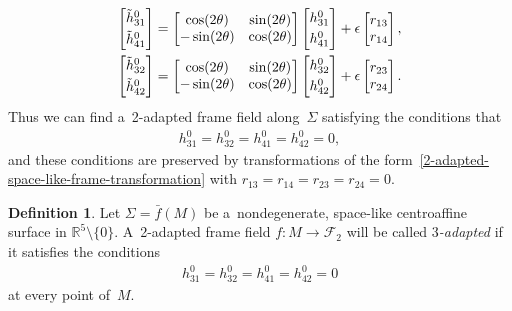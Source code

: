 \documentclass[pdftex]{sigma}
\numberwithin{equation}{section}
\theoremstyle{definition}
\newtheorem{dfn}[teo]{Definition}
\begin{document}
\begin{gather*}
\begin{bmatrix}
\tilde{h}^0_{31}
\vspace{1mm}\\
\tilde{h}^0_{41}
\end{bmatrix}
=
\begin{bmatrix}
\cos(2\theta) & \sin(2\theta)
\\
-\sin(2\theta) & \cos(2\theta)
\end{bmatrix}
\begin{bmatrix}
h^0_{31}
\vspace{1mm}\\
h^0_{41}
\end{bmatrix}
+ \epsilon
\begin{bmatrix}
r_{13}
\\
r_{14}
\end{bmatrix},
\\
\begin{bmatrix}
\tilde{h}^0_{32}
\vspace{1mm}\\
\tilde{h}^0_{42}
\end{bmatrix}
=
\begin{bmatrix}
\cos(2\theta) & \sin(2\theta)
\\
-\sin(2\theta) & \cos(2\theta)
\end{bmatrix}
\begin{bmatrix}
h^0_{32}
\vspace{1mm}\\
h^0_{42}
\end{bmatrix}
+ \epsilon
\begin{bmatrix}
r_{23}
\\
r_{24}
\end{bmatrix}.
\end{gather*}
Thus we can f\/ind a~2-adapted frame f\/ield along~$\Sigma$ satisfying the conditions that
\begin{gather*}
h^0_{31} = h^0_{32} = h^0_{41} = h^0_{42} = 0,
\end{gather*}
and these conditions are preserved by transformations of the form~\eqref{2-adapted-space-like-frame-transformation} with
$r_{13} = r_{14} = r_{23} = r_{24} = 0$.

\begin{dfn}
Let $\Sigma = \bar{f}(M)$ be a~nondegenerate, space-like centroaf\/f\/ine surface in $\mathbb{R}^5 \setminus \{0\}$.
A~2-adapted frame f\/ield $f:M \to \mathcal{F}_2$ will be called {\em $3$-adapted} if it satisf\/ies the conditions
\begin{gather}
h^0_{31} = h^0_{32} = h^0_{41} = h^0_{42} = 0
\label{3-adapted-space-like-h}
\end{gather}
at every point of~$M$.
\end{dfn}
\end{document}
